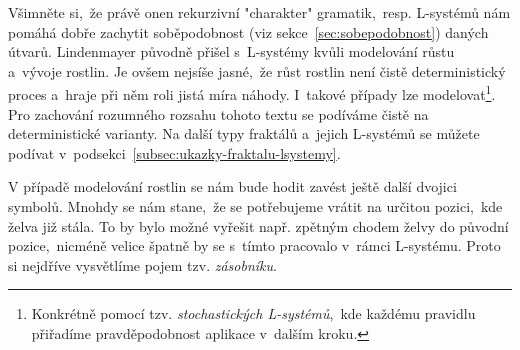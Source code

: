 Všimněte si,~že právě onen rekurzivní "charakter" gramatik,~resp. L-systémů nám pomáhá dobře zachytit soběpodobnost (viz sekce~\ref{sec:sobepodobnost}) daných útvarů. Lindenmayer původně přišel s~L-systémy kvůli modelování růstu a~vývoje rostlin. Je ovšem nejsíše jasné,~že růst rostlin není čistě deterministický proces a~hraje při něm roli jistá míra náhody. \cite{Prusinkiewicz1990} I~takové případy lze modelovat\footnote{Konkrétně pomocí tzv. \emph{stochastických L-systémů},~kde každému pravidlu přiřadíme pravděpodobnost aplikace v~dalším kroku.}. Pro zachování rozumného rozsahu tohoto textu se podíváme čistě na deterministické varianty. Na další typy fraktálů a~jejich L-systémů se můžete podívat v~podsekci~\ref{subsec:ukazky-fraktalu-lsystemy}.

V případě modelování rostlin se nám bude hodit zavést ještě další dvojici symbolů. Mnohdy se nám stane,~že se potřebujeme vrátit na určitou pozici,~kde želva již stála. To by bylo možné vyřešit např. zpětným chodem želvy do původní pozice,~nicméně velice špatně by se s~tímto pracovalo v~rámci L-systému. Proto si nejdříve vysvětlíme pojem tzv. \emph{zásobníku}.

